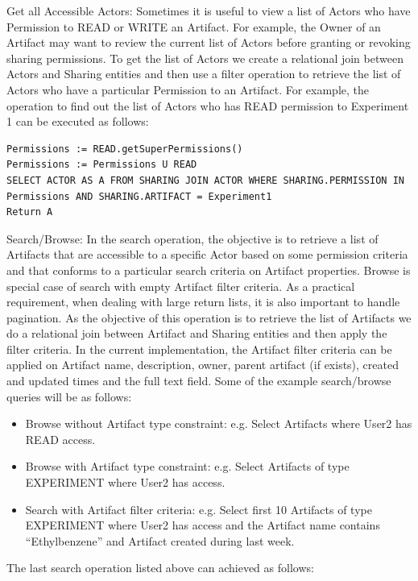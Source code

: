 \documentclass[sigconf]{acmart}
\begin{document}
Get all Accessible Actors: Sometimes it is useful to view a list of Actors who have Permission to READ or WRITE an Artifact. For example, the Owner of an Artifact may want to review the current list of Actors before granting or revoking sharing permissions. To get the list of Actors we create a relational join between Actors and Sharing entities and then use a filter operation to retrieve the list of Actors who have a particular Permission to an Artifact. For example, the operation to find out the list of Actors who has READ permission to Experiment 1 can be executed as follows:

\begin{lstlisting}
Permissions := READ.getSuperPermissions()
Permissions := Permissions U READ
SELECT ACTOR AS A FROM SHARING JOIN ACTOR WHERE SHARING.PERMISSION IN Permissions AND SHARING.ARTIFACT = Experiment1
Return A
\end{lstlisting}

Search/Browse: In the search operation, the objective is to retrieve a list of Artifacts that are accessible to a specific Actor based on some permission criteria and that conforms to a particular search criteria on Artifact properties. Browse is special case of search with empty Artifact filter criteria. As a practical requirement, when dealing with large return lists, it is also important to handle pagination. As the objective of this operation is to retrieve the list of Artifacts we do a relational join between Artifact and Sharing entities and then apply the filter criteria. In the current implementation, the Artifact filter criteria can be applied on Artifact name, description, owner, parent artifact (if exists), created and updated times and the full text field. Some of the example search/browse queries will be as follows:

\begin{itemize}
\item
Browse without Artifact type constraint: e.g. Select Artifacts where User2 has READ access.
\item
Browse with Artifact type constraint: e.g. Select Artifacts of type EXPERIMENT where User2 has  access.
\item
Search with Artifact filter criteria: e.g. Select first 10 Artifacts of type EXPERIMENT where User2 has  access and the Artifact name contains ``Ethylbenzene'' and Artifact created during last week.
\end{itemize}

The last search operation listed above can achieved as follows:
\end{document}
